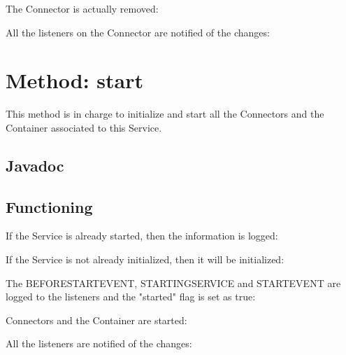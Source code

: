\documentclass[../../codeInspection.tex]{subfiles}
\begin{document}
			The Connector is actually removed:
			

			All the listeners on the Connector are notified of the changes:
			

	\section{Method: start}

		This method is in charge to initialize and start all the Connectors and the Container associated to this Service.

		\subsection{Javadoc}
			

		\subsection{Functioning}

			If the Service is already started, then the information is logged:
			

			If the Service is not already initialized, then it will be initialized:
			

			The BEFORE\textunderscore START\textunderscore EVENT, STARTING\textunderscore SERVICE and START\textunderscore EVENT are logged to the listeners and the "started" flag is set as true:
			

			Connectors and the Container are started:
			
			

			All the listeners are notified of the changes:
			
\end{document}
